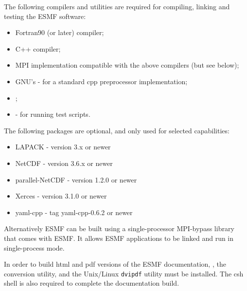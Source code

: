 

The following compilers and utilities are required for compiling, linking and
testing the ESMF software:
\begin{itemize}
\item Fortran90 (or later) compiler;
\item C++ compiler;
\item MPI implementation compatible with the above compilers (but see below);
\item GNU's  -
for a standard cpp preprocessor implementation;
\item {}; 
\item {} - for running
test scripts.
\end{itemize} 

The following packages are optional, and only used for selected capabilities:
\begin{itemize}
\item LAPACK - version 3.x or newer
\item NetCDF - version 3.6.x or newer
\item parallel-NetCDF - version 1.2.0 or newer 
\item Xerces - version 3.1.0 or newer
\item yaml-cpp - tag yaml-cpp-0.6.2 or newer
\end{itemize}

Alternatively ESMF can be built using a single-processor MPI-bypass library
that comes with ESMF. It allows ESMF applications to be linked and run in
single-process mode.

In order to build html and pdf versions of the ESMF documentation, 
,
the 
conversion utility, and the Unix/Linux {\tt dvipdf} utility must be installed.
The csh shell is also required to complete the documentation build.

